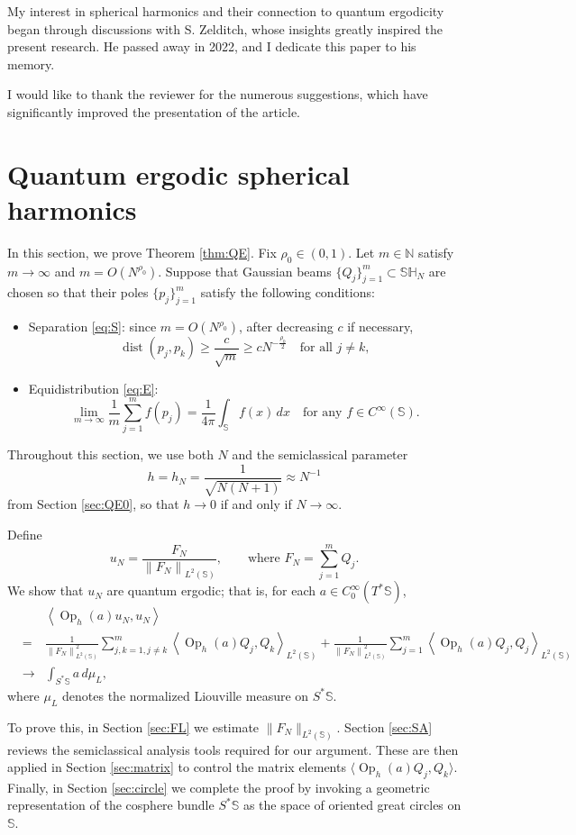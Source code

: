 \documentclass[12pt,reqno]{amsart}
\DeclareMathOperator{\dist}{dist}
\DeclareMathOperator{\Op}{Op}
\newcommand{\N}{\mathbb{N}}
\newcommand{\Sb}{\mathbb{S}}
\newcommand{\SH}{\mathbb{SH}}
\theoremstyle{plain}
\theoremstyle{definition}
\theoremstyle{remark}
\numberwithin{equation}{section}
\begin{document}
My interest in spherical harmonics and their connection to quantum ergodicity began through discussions with S. Zelditch, whose insights greatly inspired the present research. He passed away in 2022, and I dedicate this paper to his memory.

I would like to thank the reviewer for the numerous suggestions, which have significantly improved the presentation of the article.

\section{Quantum ergodic spherical harmonics}\label{sec:QE}
In this section, we prove Theorem \ref{thm:QE}. Fix $\rho_0\in(0,1)$. Let $m\in\N$ satisfy $m\to\infty$ and $m=O(N^{\rho_0})$. Suppose that Gaussian beams $\{Q_j\}_{j=1}^m\subset\SH_N$ are chosen so that their poles $\{p_j\}_{j=1}^m$ satisfy the following conditions:
\begin{itemize}
\item[(S).] Separation \eqref{eq:S}: since $m=O(N^{\rho_0})$, after decreasing $c$ if necessary,
$$\dist\left(p_j,p_k\right)\ge\frac{c}{\sqrt m}\ge cN^{-\frac{\rho_0}{2}}\quad\text{for all }j\ne k,$$
\item[(E).] Equidistribution \eqref{eq:E}:
$$\lim_{m\to\infty}\frac1m\sum_{j=1}^m f\left(p_j\right)=\frac{1}{4\pi}\int_\Sb f(x)\,dx\quad\text{for any }f\in C^\infty(\Sb).$$
\end{itemize}

Throughout this section, we use both $N$ and the semiclassical parameter
$$h=h_N=\frac{1}{\sqrt{N(N+1)}}\approx N^{-1}$$
from Section \ref{sec:QE0}, so that $h\to0$ if and only if $N\to\infty$.

Define
$$u_N=\frac{F_N}{\left\|F_N\right\|_{L^2(\Sb)}},\qquad\text{where }F_N=\sum_{j=1}^mQ_j.$$
We show that $u_N$ are quantum ergodic; that is, for each $a\in C^\infty_0(T^*\Sb)$,
\begin{eqnarray}
&&\left\langle\Op_h(a)u_N,u_N\right\rangle\nonumber\\
&=&\frac{1}{\left\|F_N\right\|_{L^2(\Sb)}^2}\sum_{j,k=1,j\ne k}^m\left\langle\Op_h(a)Q_j,Q_k\right\rangle_{L^2(\Sb)}+\frac{1}{\left\|F_N\right\|_{L^2(\Sb)}^2}\sum_{j=1}^m\left\langle\Op_h(a)Q_j,Q_j\right\rangle_{L^2(\Sb)}\label{eq:OpuN}\\
&\to&\int_{S^*\Sb}a\,d\mu_L,\nonumber
\end{eqnarray}
where $\mu_L$ denotes the normalized Liouville measure on $S^*\Sb$.  

To prove this, in Section \ref{sec:FL} we estimate $\|F_N\|_{L^2(\Sb)}$. Section \ref{sec:SA} reviews the semiclassical analysis tools required for our argument. These are then applied in Section \ref{sec:matrix} to control the matrix elements $\langle\Op_h(a)Q_j,Q_k\rangle$. Finally, in Section \ref{sec:circle} we complete the proof by invoking a geometric representation of the cosphere bundle $S^*\Sb$ as the space of oriented great circles on $\Sb$.
\end{document}
